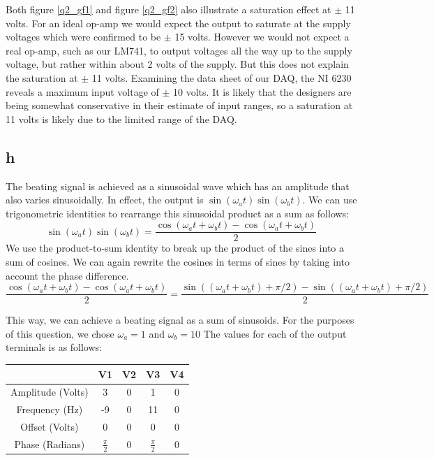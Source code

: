 \documentclass{article}
\theoremstyle{plain}
\theoremstyle{definition}
\theoremstyle{remark}
\begin{document}
Both figure \ref{q2_gf1} and figure \ref{q2_gf2} also illustrate a saturation effect at $\pm$ 11 volts.  For an ideal op-amp we would expect the output to saturate at the supply voltages which were confirmed to be  $\pm$ 15 volts. However we would not expect a real op-amp, such as our LM741, to output voltages all the way up to the supply voltage, but rather within about 2 volts of the supply.  But this does not explain the saturation at $\pm$ 11 volts.  Examining the data sheet of our DAQ, the NI 6230 reveals a maximum input voltage of $\pm$ 10 volts.  It is likely that the designers are being somewhat conservative in their estimate of input ranges, so a saturation at 11 volts is likely due to the limited range of the DAQ.


\subsection*{h} 
The beating signal is achieved as a sinusoidal wave which has an amplitude that also varies sinusoidally. In effect, the output is $\sin(\omega_a t)\sin(\omega_b t) $. We can use trigonometric identities to rearrange this sinusoidal product as a sum as follows:
$$\sin(\omega_a t)\sin(\omega_b t) = \frac{\cos(\omega_a t + \omega_b t) - \cos(\omega_a t + \omega_b t)}{2}$$
We use the product-to-sum identity to break up the product of the sines into a sum of cosines. We can again rewrite the cosines in terms of sines by taking into account the phase difference.
$$\frac{\cos(\omega_a t + \omega_b t) - \cos(\omega_a t + \omega_b t)}{2} = \frac{\sin((\omega_a t + \omega_b t) + \pi/2)- \sin((\omega_a t + \omega_b t) + \pi/2)}{2}$$

This way, we can achieve a beating signal as a sum of sinusoids. For the purposes of this question, we chose $\omega_a = 1$ and $\omega_b = 10$ The values for each of the output terminals is as follows:
\begin{table}[hbt]
\begin{center}
    \begin{tabular}{|c||c|c|c|c|}
        \hline
        ~                 & V1              & V2 & V3              & V4 \\ \hline \hline
        Amplitude (Volts) & 3               & 0  & 1               & 0  \\ \hline
        Frequency (Hz)    & -9              & 0  & 11              & 0  \\ \hline
        Offset (Volts)    & 0               & 0  & 0               & 0  \\ \hline
        Phase (Radians)            & $\frac{\pi}{2}$ & 0  & $\frac{\pi}{2}$ & 0  \\
        \hline
    \end{tabular}
\end{center}
\end{table}
\end{document}
